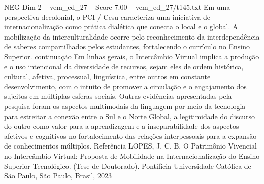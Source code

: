 \begin{textsample}{NEG Dim 2 – vem\_ed\_27 – Score 7.00 – vem\_ed\_27/t145.txt}
Em uma perspectiva decolonial, o PCI / Cesu caracteriza uma iniciativa de internacionalização como prática dialética que conecta o local e o global.
A mobilização da interculturalidade ocorre pelo reconhecimento da interdependência de saberes compartilhados pelos estudantes, fortalecendo o currículo no Ensino Superior. continuação Em linhas gerais, o Intercâmbio Virtual implica a produção e o uso intencional da diversidade de recursos, sejam eles de ordem histórica, cultural, afetiva, processual, linguística, entre outros em constante desenvolvimento, com o intuito de promover a circulação e o engajamento dos sujeitos em múltiplas esferas sociais.
Outras evidências apresentadas pela pesquisa foram os aspectos multimodais da linguagem por meio da tecnologia para estreitar a conexão entre o Sul e o Norte Global, a legitimidade do discurso do outro como valor para a aprendizagem e a inseparabilidade dos aspectos afetivos e cognitivos no fortalecimento das relações interpessoais para a expansão de conhecimentos múltiplos.
Referência LOPES, J.
C.
B.
O Patrimônio Vivencial no Intercâmbio Virtual: Proposta de Mobilidade na Internacionalização do Ensino Superior Tecnológico. (Tese de Doutorado).
Pontifícia Universidade Católica de São Paulo, São Paulo, Brasil, 2023

\end{textsample}
